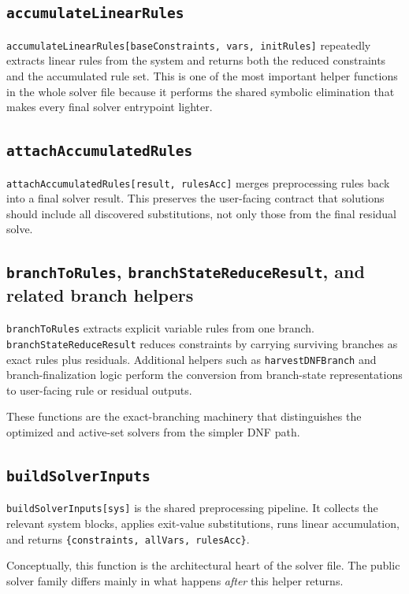 \documentclass[11pt]{article}
\begin{document}
\subsection*{\texttt{accumulateLinearRules}}

\texttt{accumulateLinearRules[baseConstraints, vars, initRules]} repeatedly extracts linear rules from the system and returns both the reduced constraints and the accumulated rule set. This is one of the most important helper functions in the whole solver file because it performs the shared symbolic elimination that makes every final solver entrypoint lighter.

\subsection*{\texttt{attachAccumulatedRules}}

\texttt{attachAccumulatedRules[result, rulesAcc]} merges preprocessing rules back into a final solver result. This preserves the user-facing contract that solutions should include all discovered substitutions, not only those from the final residual solve.

\subsection*{\texttt{branchToRules}, \texttt{branchStateReduceResult}, and related branch helpers}

\texttt{branchToRules} extracts explicit variable rules from one branch. \texttt{branchStateReduceResult} reduces constraints by carrying surviving branches as exact rules plus residuals. Additional helpers such as \texttt{harvestDNFBranch} and branch-finalization logic perform the conversion from branch-state representations to user-facing rule or residual outputs.

These functions are the exact-branching machinery that distinguishes the optimized and active-set solvers from the simpler DNF path.

\subsection*{\texttt{buildSolverInputs}}

\texttt{buildSolverInputs[sys]} is the shared preprocessing pipeline. It collects the relevant system blocks, applies exit-value substitutions, runs linear accumulation, and returns \texttt{\{constraints, allVars, rulesAcc\}}.

Conceptually, this function is the architectural heart of the solver file. The public solver family differs mainly in what happens \emph{after} this helper returns.
\end{document}
